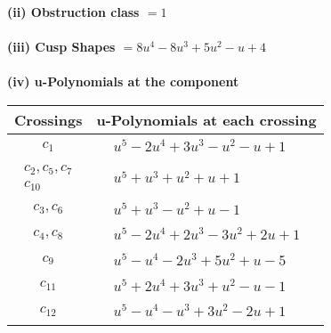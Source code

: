 \documentclass[1p]{elsarticle_modified}
\theoremstyle{definition}
\begin{document}
\flushleft \textbf{(ii) Obstruction class $= 1$}\\~\\
\flushleft \textbf{(iii) Cusp Shapes $= 8 u^4-8 u^3+5 u^2- u+4$}\\~\\
\newpage\renewcommand{\arraystretch}{1}
\flushleft \textbf{(iv) u-Polynomials at the component}\newline \\
\begin{tabular}{m{50pt}|m{274pt}}
Crossings & \hspace{64pt}u-Polynomials at each crossing \\
\hline $$\begin{aligned}c_{1}\end{aligned}$$&$\begin{aligned}
&u^5-2 u^4+3 u^3- u^2- u+1
\end{aligned}$\\
\hline $$\begin{aligned}c_{2},c_{5},c_{7}\\c_{10}\end{aligned}$$&$\begin{aligned}
&u^5+u^3+u^2+u+1
\end{aligned}$\\
\hline $$\begin{aligned}c_{3},c_{6}\end{aligned}$$&$\begin{aligned}
&u^5+u^3- u^2+u-1
\end{aligned}$\\
\hline $$\begin{aligned}c_{4},c_{8}\end{aligned}$$&$\begin{aligned}
&u^5-2 u^4+2 u^3-3 u^2+2 u+1
\end{aligned}$\\
\hline $$\begin{aligned}c_{9}\end{aligned}$$&$\begin{aligned}
&u^5- u^4-2 u^3+5 u^2+u-5
\end{aligned}$\\
\hline $$\begin{aligned}c_{11}\end{aligned}$$&$\begin{aligned}
&u^5+2 u^4+3 u^3+u^2- u-1
\end{aligned}$\\
\hline $$\begin{aligned}c_{12}\end{aligned}$$&$\begin{aligned}
&u^5- u^4- u^3+3 u^2-2 u+1
\end{aligned}$\\
\hline
\end{tabular}\\~\\
\end{document}
